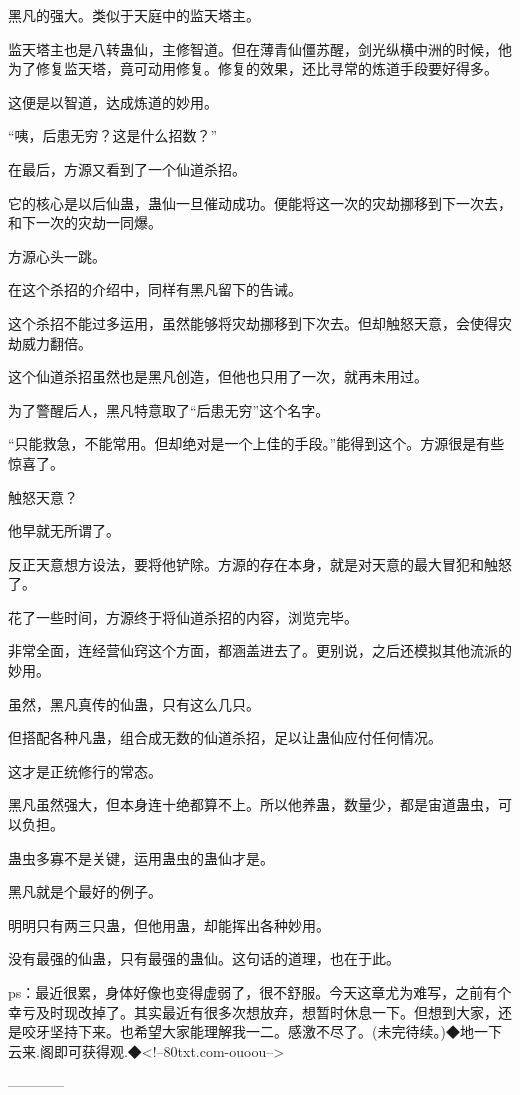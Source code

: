 \begin{this_body}
黑凡的强大。类似于天庭中的监天塔主。

监天塔主也是八转蛊仙，主修智道。但在薄青仙僵苏醒，剑光纵横中洲的时候，他为了修复监天塔，竟可动用修复。修复的效果，还比寻常的炼道手段要好得多。

这便是以智道，达成炼道的妙用。

“咦，后患无穷？这是什么招数？”

在最后，方源又看到了一个仙道杀招。

它的核心是以后仙蛊，蛊仙一旦催动成功。便能将这一次的灾劫挪移到下一次去，和下一次的灾劫一同爆。

方源心头一跳。

在这个杀招的介绍中，同样有黑凡留下的告诫。

这个杀招不能过多运用，虽然能够将灾劫挪移到下次去。但却触怒天意，会使得灾劫威力翻倍。

这个仙道杀招虽然也是黑凡创造，但他也只用了一次，就再未用过。

为了警醒后人，黑凡特意取了“后患无穷”这个名字。

“只能救急，不能常用。但却绝对是一个上佳的手段。”能得到这个。方源很是有些惊喜了。

触怒天意？

他早就无所谓了。

反正天意想方设法，要将他铲除。方源的存在本身，就是对天意的最大冒犯和触怒了。

花了一些时间，方源终于将仙道杀招的内容，浏览完毕。

非常全面，连经营仙窍这个方面，都涵盖进去了。更别说，之后还模拟其他流派的妙用。

虽然，黑凡真传的仙蛊，只有这么几只。

但搭配各种凡蛊，组合成无数的仙道杀招，足以让蛊仙应付任何情况。

这才是正统修行的常态。

黑凡虽然强大，但本身连十绝都算不上。所以他养蛊，数量少，都是宙道蛊虫，可以负担。

蛊虫多寡不是关键，运用蛊虫的蛊仙才是。

黑凡就是个最好的例子。

明明只有两三只蛊，但他用蛊，却能挥出各种妙用。

没有最强的仙蛊，只有最强的蛊仙。这句话的道理，也在于此。

ps：最近很累，身体好像也变得虚弱了，很不舒服。今天这章尤为难写，之前有个幸亏及时现改掉了。其实最近有很多次想放弃，想暂时休息一下。但想到大家，还是咬牙坚持下来。也希望大家能理解我一二。感激不尽了。(未完待续。)◆地一下云来.阁即可获得观.◆<!--80txt.com-ouoou-->

------------

\end{this_body}

